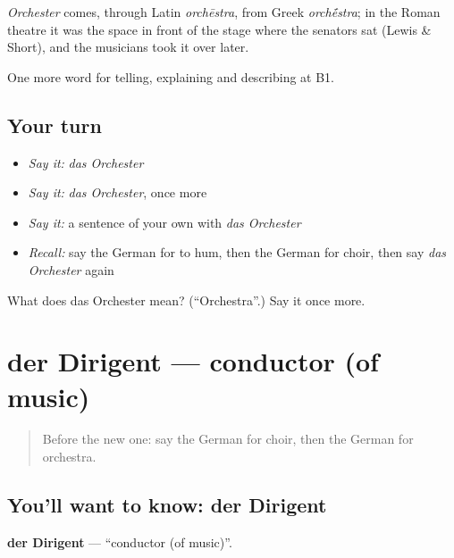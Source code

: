 \begin{cousinweb}
\emph{Orchester} comes, through Latin \emph{orchēstra}, from Greek \emph{orch\'{\={e}}stra}; in the Roman theatre it was the space in front of the stage where the senators sat (Lewis \& Short), and the musicians took it over later.
\end{cousinweb}

\begin{grammarlens}[title={What you've built}]
One more word for telling, explaining and describing at B1.
\end{grammarlens}

\subsection*{Your turn}
\begin{itemize}
\raggedright
  \item \emph{Say it:} \emph{das Orchester}
  \item \emph{Say it:} \emph{das Orchester}, once more
  \item \emph{Say it:} a sentence of your own with \emph{das Orchester}
  \item \emph{Recall:} say the German for to hum, then the German for choir, then say \emph{das Orchester} again
\end{itemize}

\begin{tcolorbox}[breakable,colback=teal!4,colframe=teal!35!black,title={Before you move on}]
What does das Orchester mean? (\textquotedblleft{}Orchestra\textquotedblright{}.) Say it once more.
\end{tcolorbox}
\section[der Dirigent]{der Dirigent — conductor (of music)}

\label{lesson:GE-C515-dirigent}



\begin{quote}
Before the new one: say the German for choir, then the German for orchestra.
\end{quote}

\subsection*{You'll want to know: der Dirigent}
\textbf{der Dirigent} — \textquotedblleft{}conductor (of music)\textquotedblright{}.

